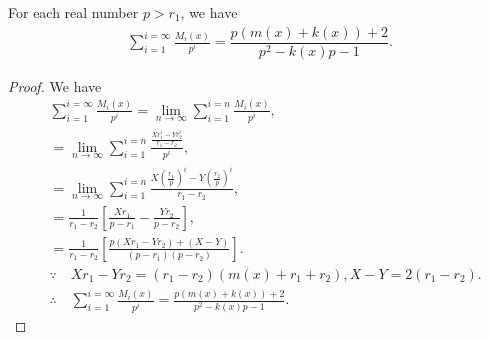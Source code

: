\begin{theorem}
For each real number $p>r_{1}$, we have
\begin{align*}
\displaystyle\sum_{i=1}^{i=\infty}\frac{M_{i}(x)}{p^i}=\dfrac{p(m(x)+k(x))+2}{p^2-k(x)p-1}.	
\end{align*}
\end{theorem}
\begin{proof}We have
\begin{align*}
& \sum_{i=1}^{i=\infty}\frac{M_{i}(x)}{p^i}=\lim_{n \to \infty }\sum_{i=1}^{i=n}\frac{M_{i}(x)}{p^i},\\
&=\lim_{n \to \infty }\sum_{i=1}^{i=n}\frac{\frac{Xr_{1}^i-Yr_{2}^i}{r_{1}-r_{2}}}{p^i},\\	
&=\lim_{n \to \infty }\sum_{i=1}^{i=n}\frac{X(\frac{r_{1}}{p})^i-Y(\frac{r_{2}}{p})^i}{r_{1}-r_{2}},\\
&=\frac{1}{r_{1}-r_{2}}[\frac{Xr_{1}}{p-r_{1}}-\frac{Yr_{2}}{p-r_{2}}],\\
&=\frac{1}{r_{1}-r_{2}}[\frac{p(Xr_{1}-Yr_{2})+(X-Y)}{(p-r_{1})(p-r_{2})}].\\
&\because\quad Xr_{1}-Yr_{2}=(r_{1}-r_{2})(m(x)+r_{1}+r_{2}),X-Y=2(r_{1}-r_{2}).\\
&\therefore\quad\sum_{i=1}^{i=\infty}\frac{M_{i}(x)}{p^i}=\frac{p(m(x)+k(x))+2}{p^2-k(x)p-1}.
\end{align*}
\end{proof}
